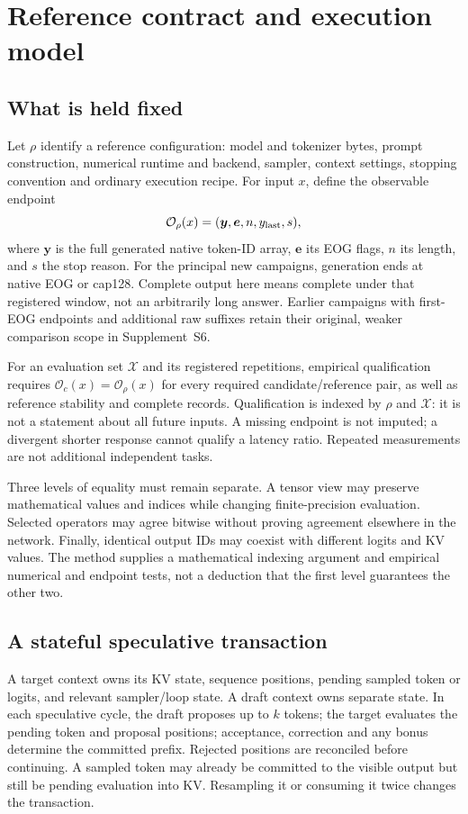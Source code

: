 \section{Reference contract and execution model}
\label{sec:problem}
\subsection{What is held fixed}
Let $\rho$ identify a reference configuration: model and tokenizer bytes, prompt construction, numerical runtime and backend, sampler, context settings, stopping convention and ordinary execution recipe. For input $x$, define the observable endpoint
\begin{equation}
\mathcal O_\rho(x)=(\boldsymbol y,\boldsymbol e,n,y_{\rm last},s),
\label{eq:contract}
\end{equation}
where $\boldsymbol y$ is the full generated native token-ID array, $\boldsymbol e$ its EOG flags, $n$ its length, and $s$ the stop reason. For the principal new campaigns, generation ends at native EOG or cap128. Complete output here means complete under that registered window, not an arbitrarily long answer. Earlier campaigns with first-EOG endpoints and additional raw suffixes retain their original, weaker comparison scope in Supplement~S6.

For an evaluation set $\mathcal X$ and its registered repetitions, empirical qualification requires $\mathcal O_c(x)=\mathcal O_\rho(x)$ for every required candidate/reference pair, as well as reference stability and complete records. Qualification is indexed by $\rho$ and $\mathcal X$: it is not a statement about all future inputs. A missing endpoint is not imputed; a divergent shorter response cannot qualify a latency ratio. Repeated measurements are not additional independent tasks.

Three levels of equality must remain separate. A tensor view may preserve mathematical values and indices while changing finite-precision evaluation. Selected operators may agree bitwise without proving agreement elsewhere in the network. Finally, identical output IDs may coexist with different logits and KV values. The method supplies a mathematical indexing argument and empirical numerical and endpoint tests, not a deduction that the first level guarantees the other two.

\subsection{A stateful speculative transaction}
A target context owns its KV state, sequence positions, pending sampled token or logits, and relevant sampler/loop state. A draft context owns separate state. In each speculative cycle, the draft proposes up to $k$ tokens; the target evaluates the pending token and proposal positions; acceptance, correction and any bonus determine the committed prefix. Rejected positions are reconciled before continuing. A sampled token may already be committed to the visible output but still be pending evaluation into KV. Resampling it or consuming it twice changes the transaction.

